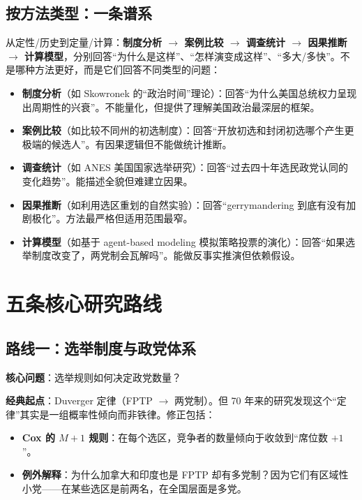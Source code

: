 \documentclass[12pt,a4paper]{ctexart}
\begin{document}
\subsection{按方法类型：一条谱系}

从定性/历史到定量/计算：\textbf{制度分析 $\rightarrow$ 案例比较 $\rightarrow$ 调查统计 $\rightarrow$ 因果推断 $\rightarrow$ 计算模型}，分别回答``为什么是这样''、``怎样演变成这样''、``多大/多快''。不是哪种方法更好，而是它们回答不同类型的问题：

\begin{itemize}
  \item \textbf{制度分析}（如 Skowronek 的``政治时间''理论）：回答``为什么美国总统权力呈现出周期性的兴衰''。不能量化，但提供了理解美国政治最深层的框架。
  \item \textbf{案例比较}（如比较不同州的初选制度）：回答``开放初选和封闭初选哪个产生更极端的候选人''。有因果逻辑但不能做统计推断。
  \item \textbf{调查统计}（如 ANES 美国国家选举研究）：回答``过去四十年选民政党认同的变化趋势''。能描述全貌但难建立因果。
  \item \textbf{因果推断}（如利用选区重划的自然实验）：回答``gerrymandering 到底有没有加剧极化''。方法最严格但适用范围最窄。
  \item \textbf{计算模型}（如基于 agent-based modeling 模拟策略投票的演化）：回答``如果选举制度改变了，两党制会瓦解吗''。能做反事实推演但依赖假设。
\end{itemize}

\section{五条核心研究路线}

\subsection{路线一：选举制度与政党体系}

\textbf{核心问题}：选举规则如何决定政党数量？

\textbf{经典起点}：Duverger 定律（FPTP $\rightarrow$ 两党制）。但 70 年来的研究发现这个``定律''其实是一组概率性倾向而非铁律。修正包括：

\begin{itemize}
  \item \textbf{Cox 的 $M+1$ 规则}：在每个选区，竞争者的数量倾向于收敛到``席位数 $+1$''。
  \item \textbf{例外解释}：为什么加拿大和印度也是 FPTP 却有多党制？因为它们有区域性小党——在某些选区是前两名，在全国层面是多党。
\end{itemize}
\end{document}
